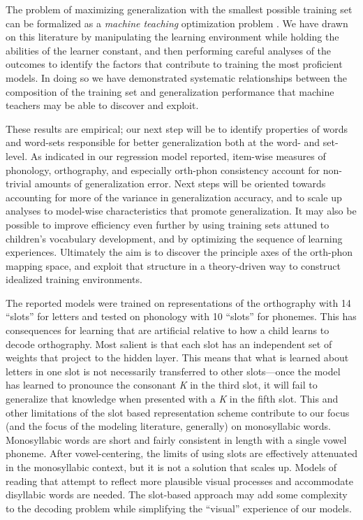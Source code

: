\documentclass[10pt,letterpaper]{article}
\begin{document}
The problem of maximizing generalization with the smallest possible training set can be formalized as a \emph{machine teaching} optimization problem \cite{Zhu2015}. We have drawn on this literature by manipulating the learning environment while holding the abilities of the learner constant, and then performing careful analyses of the outcomes to identify the factors that contribute to training the most proficient models. In doing so we have demonstrated systematic relationships between the composition of the training set and generalization performance that machine teachers may be able to discover and exploit. 

These results are empirical; our next step will be to identify properties of words and word-sets responsible for better generalization both at the word- and set-level. As indicated in our regression model reported, item-wise measures of phonology, orthography, and especially orth-phon consistency account for non-trivial amounts of generalization error. Next steps will be oriented towards accounting for more of the variance in generalization accuracy, and to scale up analyses to model-wise characteristics that promote generalization. It may also be possible to improve efficiency even further by using training sets attuned to children's vocabulary development, and by optimizing the sequence of learning experiences. Ultimately the aim is to discover the principle axes of the orth-phon mapping space, and exploit that structure in a theory-driven way to construct idealized training environments.

The reported models were trained on representations of the orthography with 14 ``slots'' for letters and tested on phonology with 10 ``slots'' for phonemes.
This has consequences for learning that are artificial relative to how a child learns to decode orthography.
Most salient is that each slot has an independent set of weights that project to the hidden layer.
This means that what is learned about letters in one slot is not necessarily transferred to other slots---once the model has learned to pronounce the consonant \textit{K} in the third slot, it will fail to generalize that knowledge when presented with a \textit{K} in the fifth slot.
This and other limitations of the slot based representation scheme contribute to our focus (and the focus of the modeling literature, generally) on monosyllabic words.
Monosyllabic words are short and fairly consistent in length with a single vowel phoneme.
After vowel-centering, the limits of using slots are effectively attenuated in the monosyllabic context, but it is not a solution that scales up.
Models of reading that attempt to reflect more plausible visual processes and accommodate disyllabic words are needed.
The slot-based approach may add some complexity to the decoding problem while simplifying the ``visual'' experience of our models.
\end{document}
